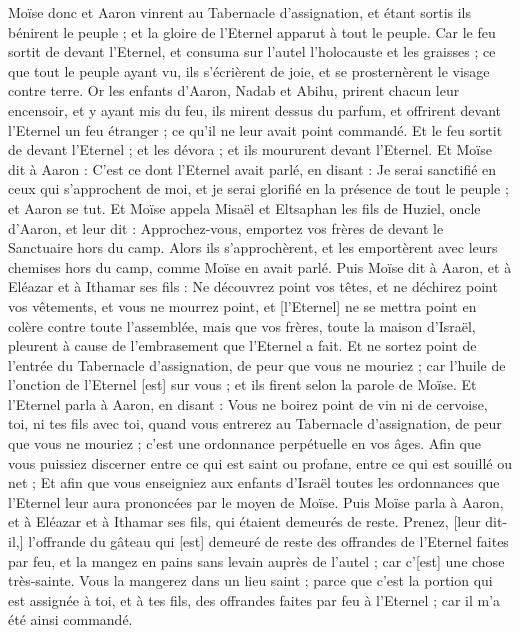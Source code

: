 \begin{multicols}{2}
Moïse donc et Aaron vinrent au Tabernacle d'assignation, et étant sortis ils bénirent le peuple ; et la gloire de l'Eternel apparut à tout le peuple.
Car le feu sortit de devant l'Eternel, et consuma sur l'autel l'holocauste et les graisses ; ce que tout le peuple ayant vu, ils s'écrièrent de joie, et se prosternèrent le visage contre terre.
\VerseOne{}Or les enfants d'Aaron, Nadab et Abihu, prirent chacun leur encensoir, et y ayant mis du feu, ils mirent dessus du parfum, et offrirent devant l'Eternel un feu étranger ; ce qu'il ne leur avait point commandé.
Et le feu sortit de devant l'Eternel ; et les dévora ; et ils moururent devant l'Eternel.
Et Moïse dit à Aaron : C'est ce dont l'Eternel avait parlé, en disant : Je serai sanctifié en ceux qui s'approchent de moi, et je serai glorifié en la présence de tout le peuple ; et Aaron se tut.
Et Moïse appela Misaël et Eltsaphan les fils de Huziel, oncle d'Aaron, et leur dit : Approchez-vous, emportez vos frères de devant le Sanctuaire hors du camp.
Alors ils s'approchèrent, et les emportèrent avec leurs chemises hors du camp, comme Moïse en avait parlé.
Puis Moïse dit à Aaron, et à Eléazar et à Ithamar ses fils : Ne découvrez point vos têtes, et ne déchirez point vos vêtements, et vous ne mourrez point, et [l'Eternel] ne se mettra point en colère contre toute l'assemblée, mais que vos frères, toute la maison d'Israël, pleurent à cause de l'embrasement que l'Eternel a fait.
Et ne sortez point de l'entrée du Tabernacle d'assignation, de peur que vous ne mouriez ; car l'huile de l'onction de l'Eternel [est] sur vous ; et ils firent selon la parole de Moïse.
Et l'Eternel parla à Aaron, en disant :
Vous ne boirez point de vin ni de cervoise, toi, ni tes fils avec toi, quand vous entrerez au Tabernacle d'assignation, de peur que vous ne mouriez ; c'est une ordonnance perpétuelle en vos âges.
Afin que vous puissiez discerner entre ce qui est saint ou profane, entre ce qui est souillé ou net ;
Et afin que vous enseigniez aux enfants d'Israël toutes les ordonnances que l'Eternel leur aura prononcées par le moyen de Moïse.
Puis Moïse parla à Aaron, et à Eléazar et à Ithamar ses fils, qui étaient demeurés de reste. Prenez, [leur dit-il,] l'offrande du gâteau qui [est] demeuré de reste des offrandes de l'Eternel faites par feu, et la mangez en pains sans levain auprès de l'autel ; car c'[est] une chose très-sainte.
Vous la mangerez dans un lieu saint ; parce que c'est la portion qui est assignée à toi, et à tes fils, des offrandes faites par feu à l'Eternel ; car il m'a été ainsi commandé.

\end{multicols}
